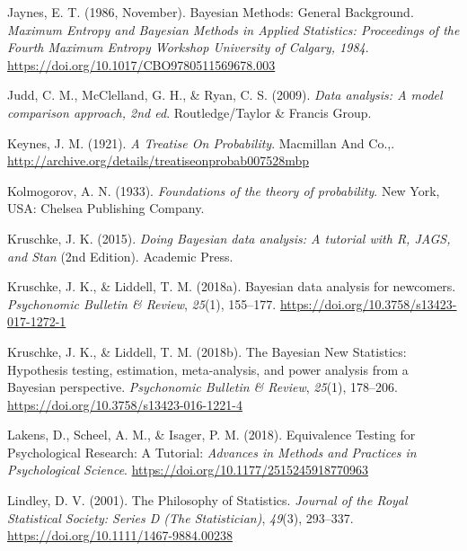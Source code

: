 \documentclass[
  a4paper,11pt,twoside,onecolumn,openright,final,oldfontcommands]{memoir}
\newlength{\cslhangindent}
\newlength{\cslentryspacingunit} %
\newenvironment{CSLReferences}[2] %
 {%
  \setlength{\parindent}{0pt}
  \ifodd #1
  \let\oldpar\par
  \def\par{\hangindent=\cslhangindent\oldpar}
  \fi
  \setlength{\parskip}{#2\cslentryspacingunit}
 }%
 {}
\theoremstyle{definition}
\theoremstyle{definition}
\theoremstyle{definition}
\theoremstyle{definition}
\theoremstyle{remark}
\begin{document}
\begin{CSLReferences}{1}{0}
\leavevmode{}%
Jaynes, E. T. (1986, November). Bayesian {Methods}: {General} {Background}. \emph{Maximum {Entropy} and {Bayesian} {Methods} in {Applied} {Statistics}: {Proceedings} of the {Fourth} {Maximum} {Entropy} {Workshop} {University} of {Calgary}, 1984}. \url{https://doi.org/10.1017/CBO9780511569678.003}

\leavevmode{}%
Judd, C. M., McClelland, G. H., \& Ryan, C. S. (2009). \emph{Data analysis: {A} model comparison approach, 2nd ed}. Routledge/Taylor \& Francis Group.

\leavevmode{}%
Keynes, J. M. (1921). \emph{A {Treatise} {On} {Probability}}. Macmillan And Co.,. \url{http://archive.org/details/treatiseonprobab007528mbp}

\leavevmode{}%
Kolmogorov, A. N. (1933). \emph{Foundations of the theory of probability}. New York, USA: Chelsea Publishing Company.

\leavevmode{}%
Kruschke, J. K. (2015). \emph{Doing {Bayesian} data analysis: A tutorial with {R}, {JAGS}, and {Stan}} (2nd Edition). Academic Press.

\leavevmode{}%
Kruschke, J. K., \& Liddell, T. M. (2018a). Bayesian data analysis for newcomers. \emph{Psychonomic Bulletin \& Review}, \emph{25}(1), 155--177. \url{https://doi.org/10.3758/s13423-017-1272-1}

\leavevmode{}%
Kruschke, J. K., \& Liddell, T. M. (2018b). The {Bayesian} {New} {Statistics}: {Hypothesis} testing, estimation, meta-analysis, and power analysis from a {Bayesian} perspective. \emph{Psychonomic Bulletin \& Review}, \emph{25}(1), 178--206. \url{https://doi.org/10.3758/s13423-016-1221-4}

\leavevmode{}%
Lakens, D., Scheel, A. M., \& Isager, P. M. (2018). Equivalence {Testing} for {Psychological} {Research}: {A} {Tutorial}: \emph{Advances in Methods and Practices in Psychological Science}. \url{https://doi.org/10.1177/2515245918770963}

\leavevmode{}%
Lindley, D. V. (2001). The {Philosophy} of {Statistics}. \emph{Journal of the Royal Statistical Society: Series D (The Statistician)}, \emph{49}(3), 293--337. \url{https://doi.org/10.1111/1467-9884.00238}


\end{CSLReferences}
\end{document}
